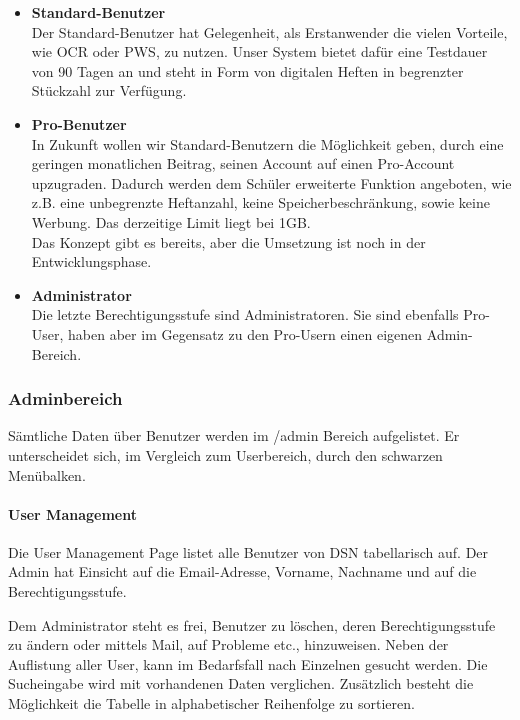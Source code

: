 \begin{itemize}
\item \textbf{Standard-Benutzer}\\ Der Standard-Benutzer hat Gelegenheit, als Erstanwender die vielen Vorteile, wie OCR oder PWS, zu nutzen. Unser System bietet dafür eine Testdauer von 90 Tagen an und steht in Form von digitalen Heften in begrenzter Stückzahl zur Verfügung.
\item \textbf{Pro-Benutzer}\\ In Zukunft wollen wir Standard-Benutzern die Möglichkeit geben, durch eine geringen monatlichen Beitrag, seinen Account auf einen Pro-Account upzugraden. Dadurch werden dem Schüler erweiterte Funktion angeboten, wie z.B. eine unbegrenzte Heftanzahl, keine Speicherbeschränkung, sowie keine Werbung. Das derzeitige Limit liegt bei 1GB.\\
Das Konzept gibt es bereits, aber die Umsetzung ist noch in der Entwicklungsphase.
\item \textbf{Administrator}\\ Die letzte Berechtigungsstufe sind Administratoren. Sie sind ebenfalls Pro-User, haben aber im Gegensatz zu den Pro-Usern einen eigenen Admin-Bereich.
\end{itemize}

\subsubsection{Adminbereich}
Sämtliche Daten über Benutzer werden im /admin Bereich aufgelistet. Er unterscheidet sich, im Vergleich zum Userbereich, durch den schwarzen Menübalken.
\paragraph{User Management}
Die User Management Page listet alle Benutzer von DSN tabellarisch auf. Der Admin hat Einsicht auf die Email-Adresse, Vorname, Nachname und auf die Berechtigungsstufe.

\newpage

Dem Administrator steht es frei, Benutzer zu löschen, deren Berechtigungsstufe zu ändern oder mittels Mail, auf Probleme etc., hinzuweisen. Neben der Auflistung aller User, kann im Bedarfsfall nach Einzelnen gesucht werden. Die Sucheingabe wird mit vorhandenen Daten verglichen. Zusätzlich besteht die Möglichkeit die Tabelle in alphabetischer Reihenfolge zu sortieren.

